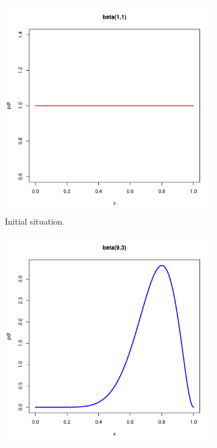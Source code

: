 \documentclass{article} %
\begin{document}
\begin{figure}
  \centering
  \begin{subfigure}{.30\textwidth}
    \centering
    \includegraphics[width=.9\linewidth]{beta1.pdf}
    \caption{Initial situation.}
    \label{fig:beta1}
  \end{subfigure}%
  \begin{subfigure}{.30\textwidth}
    \centering
    \includegraphics[width=.9\linewidth]{beta2.pdf}

\end{subfigure}
\end{figure}
\end{document}

